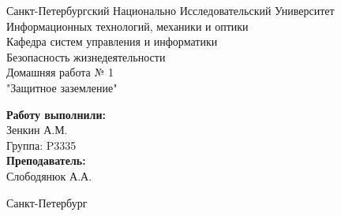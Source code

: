 \begin{titlepage}	%

	\begin{center}		%

		\large Санкт-Петербургский Национально Исследовательский Университет\\
		\large Информационных технологий, механики и оптики \\
		\large Кафедра систем управления и информатики\\[6cm]
		
		\huge Безопасность жизнедеятельности\\[0.5cm] %
		\large Домашняя работа № 1\\[0.1cm]
		\large "Защитное заземление"\\[5cm]

	\end{center}


	\begin{flushright} %
		\begin{minipage}{0.25\textwidth} %
			\begin{flushleft} %

				\large\textbf{Работу выполнили:}\\
				\large Зенкин А.М.\\
				\large {Группа:} P3335\\
				
				\large \textbf{Преподаватель:}\\
				\large 	Слободянюк А.А.

			\end{flushleft}
		\end{minipage}
	\end{flushright}
	
	\vfill %

	\begin{center}
	\large Санкт-Петербург\\
	\large \the\year %
	\end{center} %

\thispagestyle{empty} %
\end{titlepage} %

\vfill %
